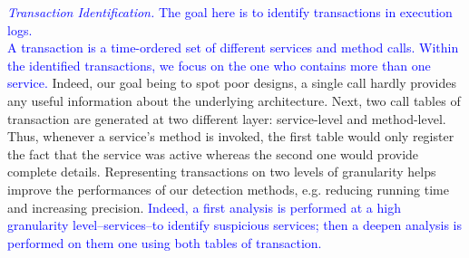 
\noindent \textcolor{blue}{\noindent \emph{Transaction Identification.} The goal here is to identify transactions in execution logs. 
\vspace{.15cm}
\\
\noindent A transaction is a time-ordered set of different services and method calls. Within the identified transactions, we focus on the one who contains more than one service.} Indeed, our goal
being to spot poor designs, a single call hardly provides any
useful information about the underlying architecture.
Next, two call tables of transaction are generated at two different layer: service-level and method-level. Thus, whenever a service's method is invoked, the first table would
only register the fact that the service was active whereas the second one
would provide complete details.  Representing transactions on two levels of granularity
helps improve the performances of our detection methods,
e.g. reducing running time and increasing precision. \textcolor{blue}{Indeed, a first analysis is performed at a high granularity level--services--to identify suspicious services; then a deepen analysis is performed on them one using both tables of transaction. }



%
%
%
